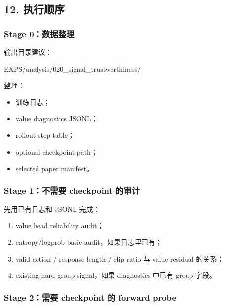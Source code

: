 \documentclass[
  10pt,
]{ctexart}
\newenvironment{Shaded}{}{}
\newcommand{\NormalTok}[1]{#1}
\providecommand{\tightlist}{%
  \setlength{\itemsep}{0pt}\setlength{\parskip}{0pt}}
\begin{document}
\subsection{12. 执行顺序}\label{ux6267ux884cux987aux5e8f}

\subsubsection{Stage 0：数据整理}\label{stage-0ux6570ux636eux6574ux7406}

输出目录建议：

\begin{Shaded}
\begin{Highlighting}[]
\NormalTok{EXPS/analysis/020\_signal\_trustworthiness/}
\end{Highlighting}
\end{Shaded}

整理：

\begin{itemize}
\tightlist
\item
  训练日志；
\item
  value diagnostics JSONL；
\item
  rollout step table；
\item
  optional checkpoint path；
\item
  selected paper manifest。
\end{itemize}

\subsubsection{Stage 1：不需要 checkpoint
的审计}\label{stage-1ux4e0dux9700ux8981-checkpoint-ux7684ux5ba1ux8ba1}

先用已有日志和 JSONL 完成：

\begin{enumerate}
\def\labelenumi{\arabic{enumi}.}
\tightlist
\item
  value head reliability audit；
\item
  entropy/logprob basic audit，如果日志里已有；
\item
  valid action / response length / clip ratio 与 value residual 的关系；
\item
  existing hard group signal，如果 diagnostics 中已有 group 字段。
\end{enumerate}

\subsubsection{Stage 2：需要 checkpoint 的 forward
probe}\label{stage-2ux9700ux8981-checkpoint-ux7684-forward-probe}
\end{document}

